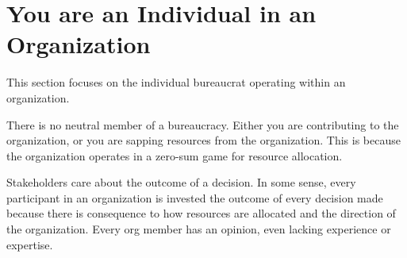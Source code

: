 \documentclass{book}
\begin{document}
  \section{You are an Individual in an Organization}
  
    This section focuses on the individual bureaucrat operating within an organization. 
    
    There is no neutral member of a bureaucracy. Either you are contributing to the organization, or you are sapping resources from the organization. This is because the organization operates in a zero-sum game for resource allocation.
    
    
    
    
  \clearpage
    
    
    
    
    
    
    
    
  \clearpage


    Stakeholders care about the outcome of a decision. 
    In some sense, every participant in an organization is invested the outcome of every decision made because there is consequence to how resources are allocated and the direction of the organization. Every org member has an opinion, even lacking experience or expertise. 
    
    
    
%    
    
\end{document}
